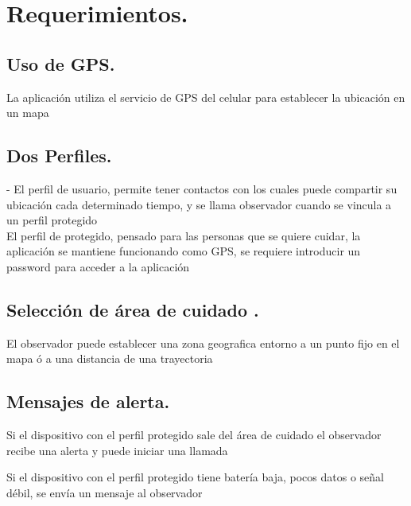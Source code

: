 \documentclass[10pt]{article}
\begin{document}
\section{Requerimientos.}
\subsection{Uso de GPS.} 
La aplicación utiliza el servicio de GPS del celular para establecer la ubicación en un mapa  
\subsection{Dos Perfiles.}
- El perfil de usuario, permite tener contactos con los cuales puede compartir su ubicación cada determinado tiempo, y se llama observador cuando se vincula a un perfil protegido\\

El perfil de protegido, pensado para las personas que se quiere cuidar, la aplicación se mantiene funcionando como GPS, se requiere introducir un password para acceder a la aplicación 

\subsection{Selección de área de cuidado .}

El observador puede establecer una zona geografica entorno a un punto fijo en el mapa ó a una distancia de una trayectoria 

\subsection{Mensajes de alerta.}

Si el dispositivo con el perfil protegido sale del área de cuidado el observador recibe una alerta y puede iniciar una llamada 

Si el dispositivo con el perfil protegido tiene batería baja, pocos datos o señal débil, se envía un mensaje al observador
\end{document}
